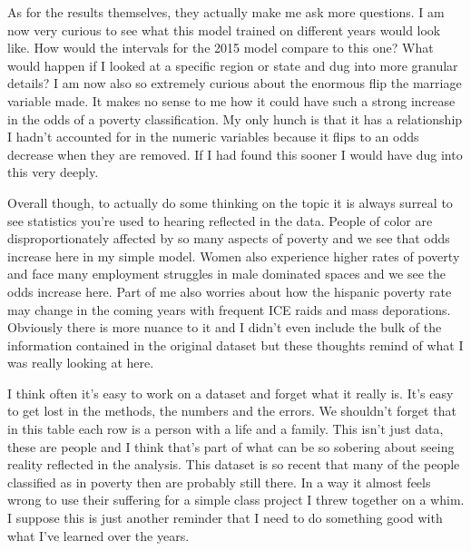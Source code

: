 As for the results themselves, they actually make me ask more questions. I am now very curious to see what this model trained on different years would look like. How would the intervals for the 2015 model compare to this one? What would happen if I looked at a specific region or state and dug into more granular details? I am now also so extremely curious about the enormous flip the marriage variable made. It makes no sense to me how it could have such a strong increase in the odds of a poverty classification. My only hunch is that it has a relationship I hadn't accounted for in the numeric variables because it flips to an odds decrease when they are removed. If I had found this sooner I would have dug into this very deeply.

Overall though, to actually do some thinking on the topic it is always surreal to see statistics you're used to hearing reflected in the data. People of color are disproportionately affected by so many aspects of poverty and we see that odds increase here in my simple model. Women also experience higher rates of poverty and face many employment struggles in male dominated spaces and we see the odds increase here. Part of me also worries about how the hispanic poverty rate may change in the coming years with frequent ICE raids and mass deporations. Obviously there is more nuance to it and I didn't even include the bulk of the information contained in the original dataset but these thoughts remind of what I was really looking at here.  

I think often it's easy to work on a dataset and forget what it really is. It's easy to get lost in the methods, the numbers and the errors. We shouldn't forget that in this table each row is a person with a life and a family. This isn't just data, these are people and I think that's part of what can be so sobering about seeing reality reflected in the analysis. This dataset is so recent that many of the people classified as in poverty then are probably still there. In a way it almost feels wrong to use their suffering for a simple class project I threw together on a whim. I suppose this is just another reminder that I need to do something good with what I've learned over the years. 